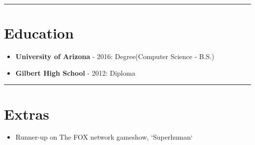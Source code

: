 \documentclass{article}
\begin{document}
\noindent\rule{\linewidth}{1pt}

\section*{Education}

\begin{itemize}\item \textbf{University of Arizona} - 2016: Degree(Computer Science - B.S.)\newline
\newline
\item \textbf{Gilbert High School} - 2012: Diploma\end{itemize}

\noindent\rule{\linewidth}{1pt}

\section*{Extras}

\begin{itemize}\item Runner-up on The FOX network gameshow, `Superhuman`\end{itemize}

\vspace*{\fill}

\end{document}
